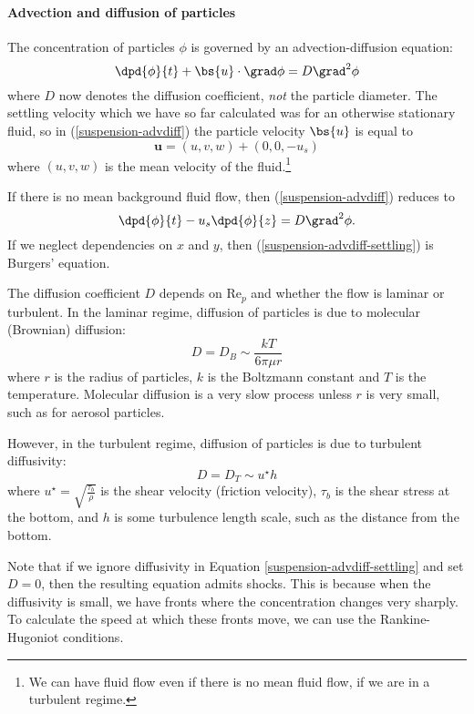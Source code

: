 \paragraph{Advection and diffusion of particles} The concentration of particles $\phi$ is governed by an advection-diffusion equation:
\begin{equation}
	\dpd{\phi}{t} + \bs{u}\cdot\grad\phi = D\grad^2\phi
	\label{suspension-advdiff}
\end{equation}
where $D$ now denotes the diffusion coefficient, \textit{not} the particle diameter. The settling velocity which we have so far calculated was for an otherwise stationary fluid, so in (\ref{suspension-advdiff}) the particle velocity $\bs{u}$ is equal to
\begin{equation}
 	\mathbf{u} = (u, v, w) + (0, 0, -u_s)
\end{equation}
where $(u,v,w)$ is the mean velocity of the fluid.\footnote{We can have fluid flow even if there is no mean fluid flow, if we are in a turbulent regime.}

If there is no mean background fluid flow, then (\ref{suspension-advdiff}) reduces to
\begin{equation}
    \dpd{\phi}{t} - u_s\dpd{\phi}{z} = D\grad^2\phi.
    \label{suspension-advdiff-settling}
\end{equation}
If we neglect dependencies on $x$ and $y$, then (\ref{suspension-advdiff-settling}) is Burgers' equation. 

The diffusion coefficient $D$ depends on $\mathrm{Re}_p$ and whether the flow is laminar or turbulent. In the laminar regime, diffusion of particles is due to molecular (Brownian) diffusion: 
\begin{equation}
    D = D_B \sim \frac{kT}{6\pi\mu r}
\end{equation}
where $r$ is the radius of particles, $k$ is the Boltzmann constant and $T$ is the temperature. Molecular diffusion is a very slow process unless $r$ is very small, such as for aerosol particles.

However, in the turbulent regime, diffusion of particles is due to turbulent diffusivity:
\begin{equation}
    D = D_T \sim u^\star h
\end{equation}
where $u^\star = \sqrt{\frac{\tau_b}{\rho}}$ is the shear velocity (friction velocity), $\tau_b$ is the shear stress at the bottom, and $h$ is some turbulence length scale, such as the distance from the bottom.

Note that if we ignore diffusivity in Equation \ref{suspension-advdiff-settling} and set $D=0$, then the resulting equation admits shocks. This is because when the diffusivity is small, we have fronts where the concentration changes very sharply. To calculate the speed at which these fronts move, we can use the Rankine-Hugoniot conditions.

